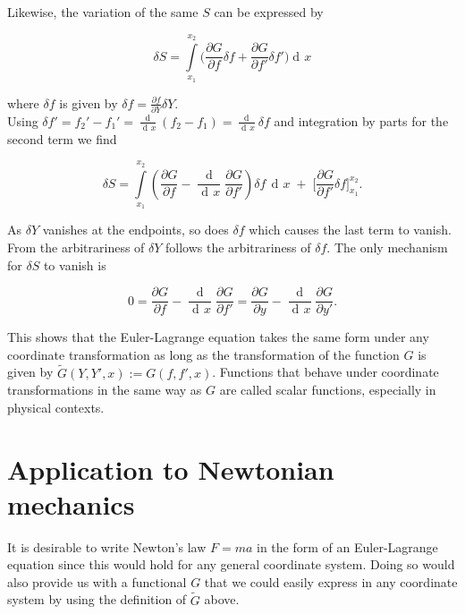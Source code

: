 \documentclass{article}
\DeclareMathOperator{\dd}{d\!}
\DeclareMathOperator{\ddd}{\mathrm{d}}
\begin{document}
Likewise, the variation of the same $S$ can be expressed by

\begin{equation}
\delta S = \int\limits_{x_1}^{x_2} \bigg( \frac{\partial G}{\partial f} \delta f
+ \frac{\partial G}{\partial f'} \delta f' \bigg) \dd x
\end{equation}

where $\delta f$ is given by $\delta f = \frac{\partial f}{\partial Y} \delta Y$. \\


Using $\delta f' = f_2' - f_1' = \frac{\dd}{\dd x}(f_2 - f_1) = \frac{\dd}{\dd x} \delta f$ and integration by parts for the second term we find


\begin{equation}
\delta S = \int\limits_{x_1}^{x_2} \left( \frac{\partial G}{\partial f}
- \frac{\ddd}{\dd x} \frac{\partial G}{\partial f'} \right) \delta f \, \dd x \;
+ \; \bigg[\frac{\partial G}{\partial f'} \delta f \bigg]_{x_1}^{x_2}.
\end{equation}


As $\delta Y$ vanishes at the endpoints, so does $\delta f$ which causes the last term to vanish. From the arbitrariness of $\delta Y$ follows the arbitrariness of $\delta f$. The only mechanism for $\delta S$ to vanish is

\begin{equation}
0 = \frac{\partial G}{\partial f} - \frac{\ddd}{\dd x} \frac{\partial G}{\partial f'}
= \frac{\partial G}{\partial y} - \frac{\ddd}{\dd x} \frac{\partial G}{\partial y'}.
\end{equation}

This shows that the Euler-Lagrange equation takes the same form under any coordinate transformation as long as the transformation of the function $G$ is given by $\widetilde{G}(Y,Y',x) := G(f,f',x)$. Functions that behave under coordinate transformations in the same way as $G$ are called scalar functions, especially in physical contexts.

\section{Application to Newtonian mechanics \cite{Guthrie}} %


It is desirable to write Newton's law $F=ma$ in the form of an Euler-Lagrange equation since this would hold for any general coordinate system. Doing so would also provide us with a functional $G$ that we could easily express in any coordinate system by using the definition of $\widetilde{G}$ above.\\
\end{document}
